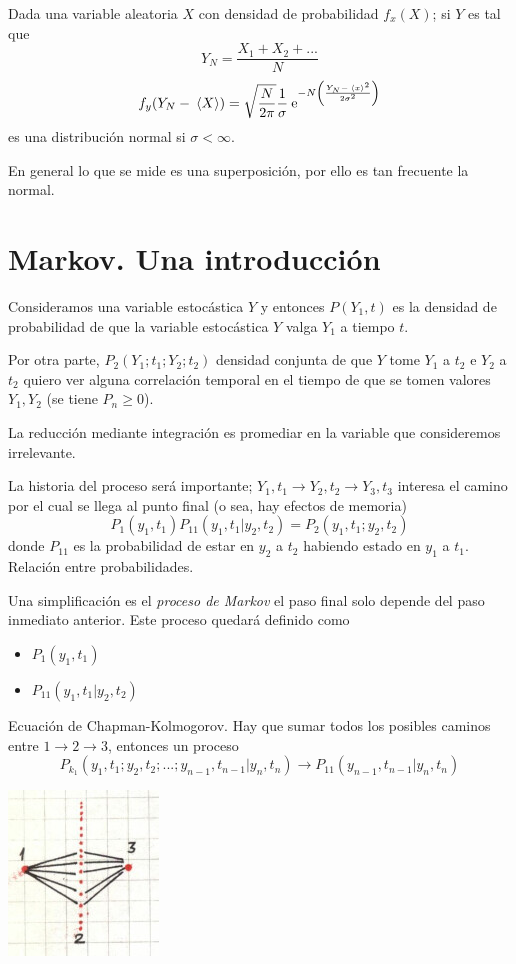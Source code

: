 \documentclass[10pt,oneside]{CBFT_book}
\begin{document}
Dada una variable aleatoria $X$ con densidad de probabilidad $f_x(X)$; si $Y$ es tal que 
\[
	Y_N = \frac{X_1 + X_2 + ... }{ N }
\]
\[
	f_y( Y_N - \:\left\langle X \right\rangle ) = \sqrt{\frac{N}{2\pi}} \frac{1}{\sigma} 
		\:\mathrm{e}^{ -N \left( \frac{  Y_N - \:\left\langle x \right\rangle^2  }{ 2\sigma^2 } \right) }
\]
es una distribución normal si $\sigma < \infty $.

En general lo que se mide es una superposición, por ello es tan frecuente la normal.

\section{Markov. Una introducción}

Consideramos una variable estocástica $Y$ y entonces $P(Y_1,t)$ es la densidad de probabilidad
de que la variable estocástica $Y$ valga $Y_1$ a tiempo $t$.

Por otra parte, $P_2(Y_1;t_1;Y_2;t_2)$ densidad conjunta de que $Y$ tome $Y_1$ a $t_2$ e $Y_2$ a $t_2$
quiero ver alguna correlación temporal en el tiempo de que se tomen valores $Y_1, Y_2$ (se tiene
$P_n \geq 0$).

La reducción mediante integración es promediar en la variable que consideremos irrelevante.

La historia del proceso será importante; $Y_1,t_1 \to Y_2,t_2 \to Y_3,t_3 $ interesa el
camino por el cual se llega al punto final (o sea, hay efectos de memoria)
\[
	P_1(y_1,t_1) P_{11}(y_1,t_1|y_2,t_2) = P_2(y_1,t_1;y_2,t_2)
\]
donde $P_{11}$ es la probabilidad de estar en $y_2$ a $t_2$ habiendo estado en $y_1$ a $t_1$.
Relación entre probabilidades.

Una simplificación es el {\it proceso de Markov} el paso final solo depende del paso inmediato
anterior. Este proceso quedará definido como
\begin{itemize}
	\item $ P_1(y_1,t_1) $
	\item $ P_{11}(y_1,t_1|y_2,t_2) $
\end{itemize}

Ecuación de Chapman-Kolmogorov. Hay que sumar todos los posibles caminos entre $1 \to 2 \to 3$,
entonces un proceso 
\[
	P_{k_1}(y_1,t_1;y_2,t_2;...;y_{n-1},t_{n-1}|y_n,t_n) \to P_{11}(y_{n-1},t_{n-1}|y_n,t_n)
\]

\includegraphics[width=0.30\textwidth]{images/1606329125.jpg}
\end{document}
